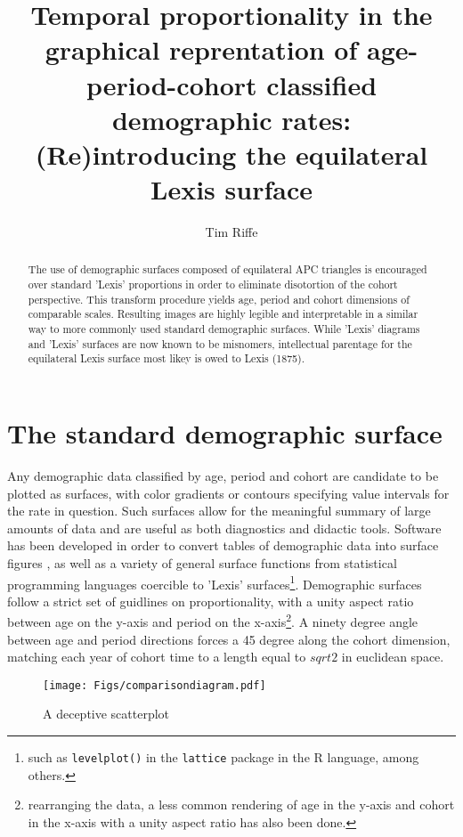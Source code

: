 \documentclass[a4paper]{article}
\begin{document}
\title{Temporal proportionality in the graphical reprentation of age-period-cohort classified demographic rates: (Re)introducing the equilateral Lexis surface}
\author{Tim Riffe}

\maketitle
\begin{abstract}
The use of demographic surfaces composed of equilateral APC triangles is encouraged over standard 'Lexis' proportions in order to eliminate disotortion of the cohort perspective. This transform procedure yields age, period and cohort dimensions of comparable scales. Resulting images are highly legible and interpretable in a similar way to more commonly used standard demographic surfaces. While 'Lexis' diagrams and 'Lexis' surfaces are now known to be misnomers, intellectual parentage for the equilateral Lexis surface most likey is owed to Lexis (1875).
\end{abstract}

\section{The standard demographic surface}
Any demographic data classified by age, period and cohort are candidate to be plotted as surfaces, with color gradients or contours specifying value intervals for the rate in question. Such surfaces allow for the meaningful summary of large amounts of data and are useful as both diagnostics and didactic tools. Software has been developed in order to convert tables of demographic data into surface figures \citep{vaupel1987thousands, andreev1999overview}, as well as a variety of general surface functions from statistical programming languages coercible to 'Lexis' surfaces\footnote{such as \texttt{levelplot()} in the \texttt{lattice} package\citep{sarkar2008lattice} in the R language\citep{ihaka1996r}, among others.}. Demographic surfaces follow a strict set of guidlines on proportionality, with a unity aspect ratio between age on the y-axis and period on the x-axis\footnote{rearranging the data, a less common rendering of age in the y-axis and cohort in the x-axis with a unity aspect ratio has also been done.}. A ninety degree angle between age and period directions forces a 45 degree along the cohort dimension, matching each year of cohort time to a length equal to $sqrt{2}$ in euclidean space.

\begin{figure}[H]
\centering
\texttt{[image: Figs/comparisondiagram.pdf]}
\caption{A deceptive scatterplot}
\end{figure}
\end{document}

